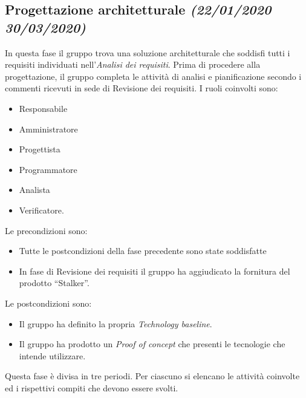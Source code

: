\documentclass[../piano-di-progetto.tex]{subfiles}
\begin{document}
\subsection[Progettazione architetturale]{Progettazione architetturale {\normalsize\normalfont\itshape(22/01/2020  30/03/2020)}}%
\label{sub:progettazione_architetturale}
In questa fase il gruppo trova una soluzione architetturale che soddisfi tutti i requisiti individuati nell'\textit{Analisi dei requisiti}.
Prima di procedere alla progettazione, il gruppo completa le attività di analisi e pianificazione secondo i commenti ricevuti in sede di Revisione dei requisiti.
I ruoli coinvolti sono:
\begin{itemize}
  \item Responsabile
  \item Amministratore
  \item Progettista
  \item Programmatore
  \item Analista
  \item Verificatore.
\end{itemize}
Le precondizioni sono:
\begin{itemize}
  \item Tutte le postcondizioni della fase precedente sono state soddisfatte
  \item In fase di Revisione dei requisiti il gruppo ha aggiudicato la fornitura del prodotto ``Stalker''.
\end{itemize}
Le postcondizioni sono:
\begin{itemize}
  \item Il gruppo ha definito la propria \textit{Technology baseline}.
  \item Il gruppo ha prodotto un \textit{Proof of concept} che presenti le tecnologie che intende utilizzare.
\end{itemize}
Questa fase è divisa in tre periodi.
Per ciascuno si elencano le attività coinvolte ed i rispettivi compiti che devono essere svolti.
\end{document}
